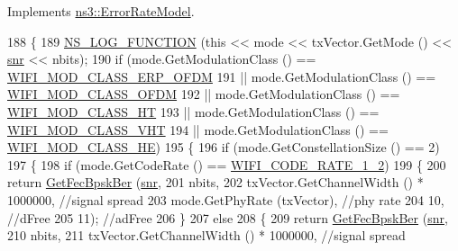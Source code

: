Implements \hyperlink{classns3_1_1ErrorRateModel_a7cb1aac92893c17de908eaad7c8ef989}{ns3\+::\+Error\+Rate\+Model}.


\begin{DoxyCode}
188 \{
189   \hyperlink{log-macros-disabled_8h_a90b90d5bad1f39cb1b64923ea94c0761}{NS\_LOG\_FUNCTION} (\textcolor{keyword}{this} << mode << txVector.GetMode () << \hyperlink{lte__amc_8m_a7543c5e4e80c828b652e0c63e4a6de70}{snr} << nbits);
190   \textcolor{keywordflow}{if} (mode.GetModulationClass () == \hyperlink{namespacens3_aa999e1221606a2b21b1eb33c2007c217afc1f5ef8d2c985f37a3224dd86ab014d}{WIFI\_MOD\_CLASS\_ERP\_OFDM}
191       || mode.GetModulationClass () == \hyperlink{namespacens3_aa999e1221606a2b21b1eb33c2007c217a30a83a0318357c9611f09e6faadc8006}{WIFI\_MOD\_CLASS\_OFDM}
192       || mode.GetModulationClass () == \hyperlink{namespacens3_aa999e1221606a2b21b1eb33c2007c217a6ac45cac36cc4454649435d24ebf349c}{WIFI\_MOD\_CLASS\_HT}
193       || mode.GetModulationClass () == \hyperlink{namespacens3_aa999e1221606a2b21b1eb33c2007c217a9863e4342bf5c238c74dddfc4d96c67e}{WIFI\_MOD\_CLASS\_VHT}
194       || mode.GetModulationClass () == \hyperlink{namespacens3_aa999e1221606a2b21b1eb33c2007c217abfa4f7272510045a9b43e8ac27ac13b0}{WIFI\_MOD\_CLASS\_HE})
195     \{
196       \textcolor{keywordflow}{if} (mode.GetConstellationSize () == 2)
197         \{
198           \textcolor{keywordflow}{if} (mode.GetCodeRate () == \hyperlink{namespacens3_aeaf3a86fd4bdb7829955238fba43e2ada66dfa017f6a74bcb72cdccfee778e90b}{WIFI\_CODE\_RATE\_1\_2})
199             \{
200               \textcolor{keywordflow}{return} \hyperlink{classns3_1_1YansErrorRateModel_abaa04063a406c62365d182fbd9eb78ec}{GetFecBpskBer} (\hyperlink{lte__amc_8m_a7543c5e4e80c828b652e0c63e4a6de70}{snr},
201                                     nbits,
202                                     txVector.GetChannelWidth () * 1000000, \textcolor{comment}{//signal spread}
203                                     mode.GetPhyRate (txVector), \textcolor{comment}{//phy rate}
204                                     10, \textcolor{comment}{//dFree}
205                                     11); \textcolor{comment}{//adFree}
206             \}
207           \textcolor{keywordflow}{else}
208             \{
209               \textcolor{keywordflow}{return} \hyperlink{classns3_1_1YansErrorRateModel_abaa04063a406c62365d182fbd9eb78ec}{GetFecBpskBer} (\hyperlink{lte__amc_8m_a7543c5e4e80c828b652e0c63e4a6de70}{snr},
210                                     nbits,
211                                     txVector.GetChannelWidth () * 1000000, \textcolor{comment}{//signal spread}

\end{DoxyCode}
